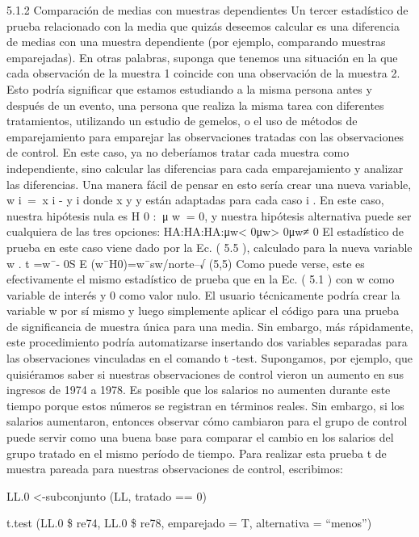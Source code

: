 \documentclass[
]{book}
\begin{document}
5.1.2 Comparación de medias con muestras dependientes
Un tercer estadístico de prueba relacionado con la media que quizás deseemos calcular es una diferencia de medias con una muestra dependiente (por ejemplo, comparando muestras emparejadas). En otras palabras, suponga que tenemos una situación en la que cada observación de la muestra 1 coincide con una observación de la muestra 2. Esto podría significar que estamos estudiando a la misma persona antes y después de un evento, una persona que realiza la misma tarea con diferentes tratamientos, utilizando un estudio de gemelos, o el uso de métodos de emparejamiento para emparejar las observaciones tratadas con las observaciones de control. En este caso, ya no deberíamos tratar cada muestra como independiente, sino calcular las diferencias para cada emparejamiento y analizar las diferencias. Una manera fácil de pensar en esto sería crear una nueva variable, w i  =  x i - y i donde x y y están adaptadas para cada caso i . En este caso, nuestra hipótesis nula es H 0 :  μ w  = 0, y nuestra hipótesis alternativa puede ser cualquiera de las tres opciones:
HA:HA:HA:μw\textless{} 0μw\textgreater{} 0μw≠ 0
El estadístico de prueba en este caso viene dado por la Ec. ( 5.5 ), calculado para la nueva variable w .
t =w¯- 0S E (w¯\textbar H0)=w¯sw/norte--√
(5,5)
Como puede verse, este es efectivamente el mismo estadístico de prueba que en la Ec. ( 5.1 ) con w como variable de interés y 0 como valor nulo. El usuario técnicamente podría crear la variable w por sí mismo y luego simplemente aplicar el código para una prueba de significancia de muestra única para una media.
Sin embargo, más rápidamente, este procedimiento podría automatizarse insertando dos variables separadas para las observaciones vinculadas en el comando t -test. Supongamos, por ejemplo, que quisiéramos saber si nuestras observaciones de control vieron un aumento en sus ingresos de 1974 a 1978. Es posible que los salarios no aumenten durante este tiempo porque estos números se registran en términos reales. Sin embargo, si los salarios aumentaron, entonces observar cómo cambiaron para el grupo de control puede servir como una buena base para comparar el cambio en los salarios del grupo tratado en el mismo período de tiempo. Para realizar esta prueba t de muestra pareada para nuestras observaciones de control, escribimos:

LL.0 \textless-subconjunto (LL, tratado == 0)

t.test (LL.0 \$ re74, LL.0 \$ re78, emparejado = T, alternativa = ``menos'')
\end{document}

